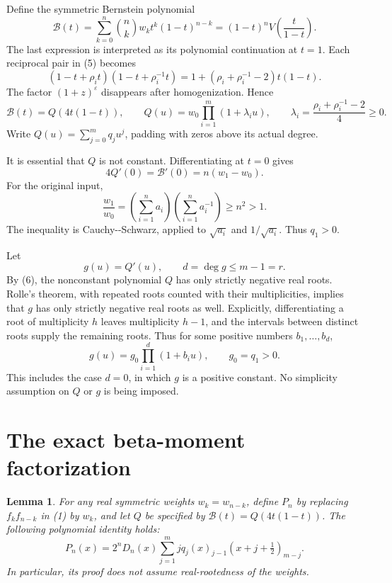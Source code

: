 \documentclass[11pt,a4paper]{article}
\newtheorem{lemma}[theorem]{Lemma}
\begin{document}
Define the symmetric Bernstein polynomial \[
 \mathcal B(t)=\sum_{k=0}^n\binom nk w_kt^k(1-t)^{n-k}
             =(1-t)^nV\!\left(\frac{t}{1-t}\right).
\] The last expression is interpreted as its polynomial continuation at \(t=1\). Each reciprocal pair in (5) becomes \[
 (1-t+\rho_i t)(1-t+\rho_i^{-1}t)
 =1+(\rho_i+\rho_i^{-1}-2)t(1-t).
\] The factor \((1+z)^\varepsilon\) disappears after homogenization. Hence \[
 \mathcal B(t)=Q(4t(1-t)),\qquad
 Q(u)=w_0\prod_{i=1}^m(1+\lambda_i u),\qquad
 \lambda_i=\frac{\rho_i+\rho_i^{-1}-2}{4}\geq0. \tag{6}
\] Write \(Q(u)=\sum_{j=0}^m q_ju^j\), padding with zeros above its actual degree.

It is essential that \(Q\) is not constant. Differentiating at \(t=0\) gives \[
 4Q'(0)=\mathcal B'(0)=n(w_1-w_0). \tag{7}
\] For the original input, \[
 \frac{w_1}{w_0}
 =\left(\sum_{i=1}^n a_i\right)
  \left(\sum_{i=1}^n a_i^{-1}\right)
 \geq n^2>1. \tag{8}
\] The inequality is Cauchy-\/-Schwarz, applied to \(\sqrt{a_i}\) and \(1/\sqrt{a_i}\). Thus \(q_1>0\).

Let \[
 g(u)=Q'(u),\qquad d=\deg g\leq m-1=r. \tag{9}
\] By (6), the nonconstant polynomial \(Q\) has only strictly negative real roots. Rolle's theorem, with repeated roots counted with their multiplicities, implies that \(g\) has only strictly negative real roots as well. Explicitly, differentiating a root of multiplicity \(h\) leaves multiplicity \(h-1\), and the intervals between distinct roots supply the remaining roots. Thus for some positive numbers \(b_1,\ldots,b_d\), \[
 g(u)=g_0\prod_{i=1}^d(1+b_i u),\qquad g_0=q_1>0. \tag{10}
\] This includes the case \(d=0\), in which \(g\) is a positive constant. No simplicity assumption on \(Q\) or \(g\) is being imposed.

\section{The exact beta-moment factorization}\label{sec:beta}
\begin{lemma}
For any real symmetric weights $w_k=w_{n-k}$, define $P_n$ by replacing $f_kf_{n-k}$ in (1) by $w_k$, and let $Q$ be specified by $\mathcal B(t)=Q(4t(1-t))$. The following polynomial identity holds:
\[
 P_n(x)=2^nD_n(x)
 \sum_{j=1}^m j q_j (x)_{j-1}(x+j+\tfrac12)_{m-j}. \tag{11}
\]
In particular, its proof does not assume real-rootedness of the weights.
\end{lemma}
\end{document}
